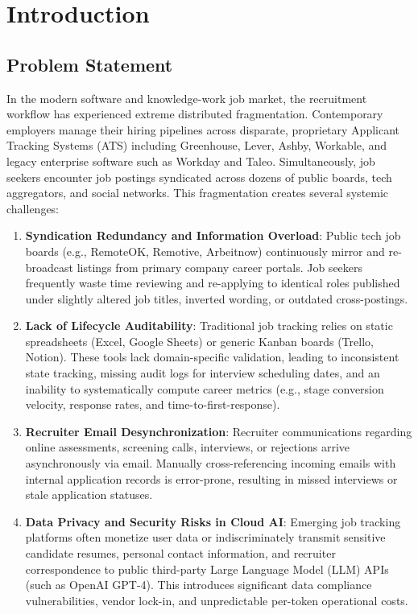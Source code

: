 \chapter{Introduction}
\label{ch:introduction}

\section{Problem Statement}
In the modern software and knowledge-work job market, the recruitment workflow has experienced extreme distributed fragmentation. Contemporary employers manage their hiring pipelines across disparate, proprietary Applicant Tracking Systems (ATS) including Greenhouse, Lever, Ashby, Workable, and legacy enterprise software such as Workday and Taleo. Simultaneously, job seekers encounter job postings syndicated across dozens of public boards, tech aggregators, and social networks. This fragmentation creates several systemic challenges:

\begin{enumerate}
    \item \textbf{Syndication Redundancy and Information Overload}: Public tech job boards (e.g., RemoteOK, Remotive, Arbeitnow) continuously mirror and re-broadcast listings from primary company career portals. Job seekers frequently waste time reviewing and re-applying to identical roles published under slightly altered job titles, inverted wording, or outdated cross-postings.
    \item \textbf{Lack of Lifecycle Auditability}: Traditional job tracking relies on static spreadsheets (Excel, Google Sheets) or generic Kanban boards (Trello, Notion). These tools lack domain-specific validation, leading to inconsistent state tracking, missing audit logs for interview scheduling dates, and an inability to systematically compute career metrics (e.g., stage conversion velocity, response rates, and time-to-first-response).
    \item \textbf{Recruiter Email Desynchronization}: Recruiter communications regarding online assessments, screening calls, interviews, or rejections arrive asynchronously via email. Manually cross-referencing incoming emails with internal application records is error-prone, resulting in missed interviews or stale application statuses.
    \item \textbf{Data Privacy and Security Risks in Cloud AI}: Emerging job tracking platforms often monetize user data or indiscriminately transmit sensitive candidate resumes, personal contact information, and recruiter correspondence to public third-party Large Language Model (LLM) APIs (such as OpenAI GPT-4). This introduces significant data compliance vulnerabilities, vendor lock-in, and unpredictable per-token operational costs.
\end{enumerate}

